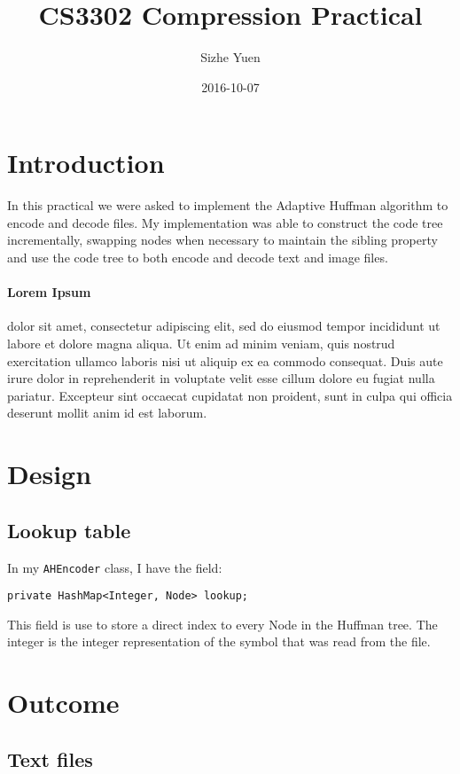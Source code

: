 \documentclass{article}
\title{CS3302 Compression Practical}
\date{2016-10-07}
\author{Sizhe Yuen}
\begin{document}
\maketitle

\newpage
{}

\section{Introduction}
In this practical we were asked to implement the Adaptive Huffman algorithm to encode and decode files. My implementation was able to construct the code tree incrementally, swapping nodes when necessary to maintain the sibling property and use the code tree to both encode and decode text and image files. 
\paragraph{Lorem Ipsum}
dolor sit amet, consectetur adipiscing elit, sed do eiusmod tempor incididunt ut labore et dolore magna aliqua. Ut enim ad minim veniam, quis nostrud exercitation ullamco laboris nisi ut aliquip ex ea commodo consequat. Duis aute irure dolor in reprehenderit in voluptate velit esse cillum dolore eu fugiat nulla pariatur. Excepteur sint occaecat cupidatat non proident, sunt in culpa qui officia deserunt mollit anim id est laborum.

\section{Design}
\subsection{Lookup table}
In my \texttt{AHEncoder} class, I have the field: 
\begin{lstlisting}
private HashMap<Integer, Node> lookup;
\end{lstlisting}
This field is use to store a direct index to every Node in the Huffman tree. The integer is the integer representation of the symbol that was read from the file. 

\section{Outcome}	
\subsection{Text files}
\end{document}
